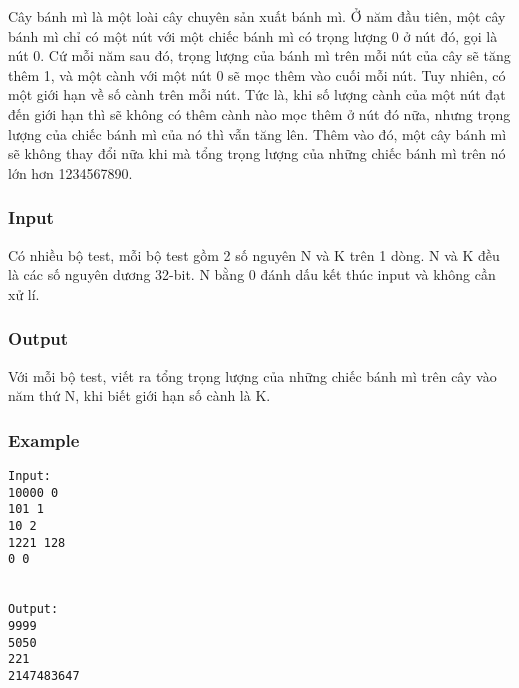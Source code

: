 



   Cây bánh mì là một loài cây chuyên sản xuất bánh mì. Ở năm đầu tiên, một cây bánh mì chỉ có một nút với một chiếc bánh mì có trọng lượng 0 ở nút đó, gọi là nút 0. Cứ mỗi năm sau đó, trọng lượng của bánh mì trên mỗi nút của cây sẽ tăng thêm 1, và một cành với một nút 0 sẽ mọc thêm vào cuối mỗi nút. Tuy nhiên, có một giới hạn về số cành trên mỗi nút. Tức là, khi số lượng cành của một nút đạt đến giới hạn thì sẽ không có thêm cành nào mọc thêm ở nút đó nữa, nhưng trọng lượng của chiếc bánh mì của nó thì vẫn tăng lên. Thêm vào đó, một cây bánh mì sẽ không thay đổi nữa khi mà tổng trọng lượng của những chiếc bánh mì trên nó lớn hơn 1234567890.  

\subsubsection{   Input  }

   Có nhiều bộ test, mỗi bộ test gồm 2 số nguyên N và K trên 1 dòng. N và K đều là các số nguyên dương 32-bit. N bằng 0 đánh dấu kết thúc input và không cần xử lí.  

\subsubsection{   Output  }

   Với mỗi bộ test, viết ra tổng trọng lượng của những chiếc bánh mì trên cây vào năm thứ N, khi biết giới hạn số cành là K.  

\subsubsection{   Example  }
\begin{verbatim}
Input:
10000 0
101 1
10 2
1221 128
0 0


Output:
9999
5050
221
2147483647

\end{verbatim}